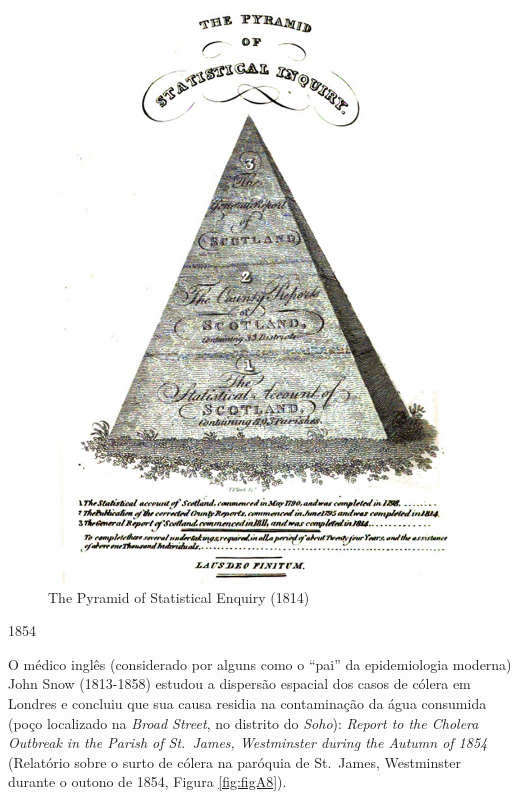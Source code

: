\documentclass[
]{book}
\begin{document}
\begin{figure}

{\centering \includegraphics[width=0.75\linewidth]{images1/sinclair} 

}

\caption{The Pyramid of Statistical Enquiry  (1814)}\label{fig:figA7}
\end{figure}

\hfill\break

1854

\hfill\break
O médico inglês (considerado por alguns como o ``pai'' da epidemiologia moderna) John Snow (1813-1858) estudou a dispersão espacial dos casos de cólera em Londres e concluiu que sua causa residia na contaminação da água consumida (poço localizado na \emph{Broad Street}, no distrito do \emph{Soho}): \emph{Report to the Cholera Outbreak in the Parish of St.~James, Westminster during the Autumn of 1854} (Relatório sobre o surto de cólera na paróquia de St.~James, Westminster durante o outono de 1854, Figura \ref{fig:figA8}).

\hfill\break
\end{document}
